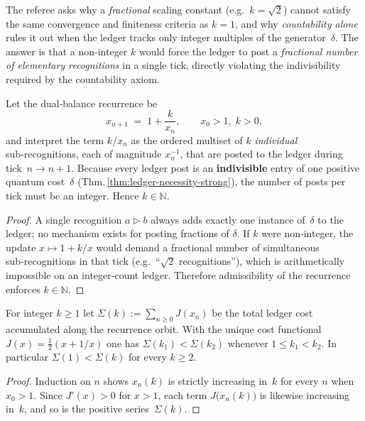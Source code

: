 The referee asks why a \emph{fractional} scaling constant
(e.g.\ $k=\sqrt2$) cannot satisfy the same convergence and finiteness
criteria as $k=1$, and why \textit{countability alone}
rules it out when the ledger tracks only integer multiples of the
generator $\delta$.  
The answer is that a non‑integer $k$ would force the ledger to post
a \emph{fractional number of elementary recognitions} in a single
tick, directly violating the indivisibility required by the
countability axiom.

\begin{lemma}
\label{lem:int-k}
Let the dual‑balance recurrence be 
\[
  x_{n+1}\;=\;1+\frac{k}{x_n},
  \qquad x_0>1,\;k>0,
\]
and interpret the term $k/x_n$ as the ordered multiset of $k$
\emph{individual} sub‑recognitions, each of magnitude $x_n^{-1}$,
that are posted to the ledger during tick $n\!\to\!n{+}1$.
Because every ledger post is an \textbf{indivisible} entry of one
positive quantum cost \(\delta\) 
(Thm.\,\ref{thm:ledger-necessity-strong}),
the number of posts per tick must be an integer.
Hence \(k\in\mathbb N\).
\end{lemma}

\begin{proof}
A single recognition $a\triangleright b$ always adds exactly one
instance of $\delta$ to the ledger; no mechanism exists for posting
fractions of $\delta$.  
If $k$ were non‑integer, the update
$x\mapsto1+k/x$ would demand a fractional number of simultaneous
sub‑recognitions in that tick
(e.g.\ “$\sqrt2$ recognitions”), which is arithmetically impossible
on an integer‑count ledger.
Therefore admissibility of the recurrence enforces \(k\in\mathbb N\).
\end{proof}

\begin{lemma}
\label{lem:k-cost}
For integer \(k\ge1\) let
\(
  \Sigma(k):=\sum_{n\ge0} J(x_n)
\)
be the total ledger cost accumulated along the recurrence orbit.
With the unique cost functional
\(J(x)=\tfrac12(x+1/x)\)
one has
\(
  \Sigma(k_1)<\Sigma(k_2)
\)
whenever \(1\le k_1<k_2\).
In particular \(\Sigma(1)<\Sigma(k)\) for every \(k\ge2\).
\end{lemma}

\begin{proof}
Induction on \(n\) shows \(x_n(k)\) is strictly increasing in \(k\)
for every \(n\) when \(x_0>1\).
Since \(J'(x)>0\) for \(x>1\), each term
\(J\!\bigl(x_n(k)\bigr)\) is likewise increasing in \(k\),
and so is the positive series \(\Sigma(k)\).
\end{proof}

